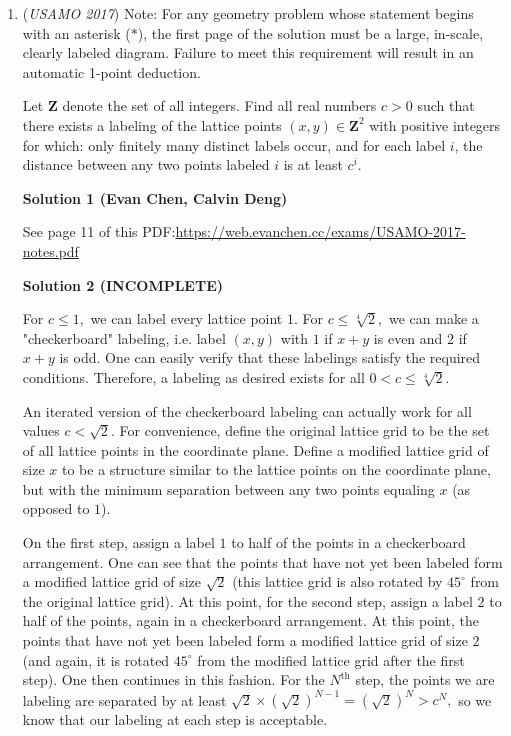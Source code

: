 \begin{enumerate}
 -tigershark22

 


	\item (\textit{USAMO 2017}) Note: For any geometry problem whose statement begins with an asterisk ($*$), the first page of the solution must be a large, in-scale, clearly labeled diagram. Failure to meet this requirement will result in an automatic 1-point deduction. 


 Let $\mathbf{Z}$ denote the set of all integers. Find all real numbers $c > 0$ such that there exists a labeling of the lattice points $( x, y ) \in \mathbf{Z}^2$ with positive integers for which:
only finitely many distinct labels occur, and
for each label $i$, the distance between any two points labeled $i$ is at least $c^i$.


 



\textbf{Solution 1 (Evan Chen, Calvin Deng)}

See page 11 of this PDF:\href{https://web.evanchen.cc/exams/USAMO-2017-notes.pdf}{https://web.evanchen.cc/exams/USAMO-2017-notes.pdf} 

 


 



\textbf{Solution 2 (INCOMPLETE)}

For $c\le 1,$ we can label every lattice point $1.$ For $c\le \sqrt[4]{2},$ we can make a "checkerboard" labeling, i.e. label $(x, y)$ with $1$ if $x+y$ is even and $2$ if $x+y$ is odd. One can easily verify that these labelings satisfy the required conditions. Therefore, a labeling as desired exists for all $0 < c\le \sqrt[4]{2}.$

 An iterated version of the checkerboard labeling can actually work for all values $c < \sqrt{2}.$ For convenience, define the original lattice grid to be the set of all lattice points in the coordinate plane. Define a modified lattice grid of size $x$ to be a structure similar to the lattice points on the coordinate plane, but with the minimum separation between any two points equaling $x$ (as opposed to $1$).

 On the first step, assign a label $1$ to half of the points in a checkerboard arrangement. One can see that the points that have not yet been labeled form a modified lattice grid of size $\sqrt{2}$ (this lattice grid is also rotated by $45^{\circ}$ from the original lattice grid). At this point, for the second step, assign a label $2$ to half of the points, again in a checkerboard arrangement. At this point, the points that have not yet been labeled form a modified lattice grid of size $2$ (and again, it is rotated $45^{\circ}$ from the modified lattice grid after the first step). One then continues in this fashion. For the $N^{\text{th}}$ step, the points we are labeling are separated by at least $\sqrt{2}\times\left(\sqrt{2}\right)^{N-1} = \left(\sqrt{2}\right)^N > c^N,$ so we know that our labeling at each step is acceptable.


\end{enumerate}
